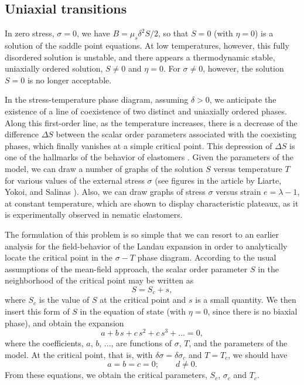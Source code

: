 \documentclass[aps,pre,reprint,amsmath,amssymbols,superscriptaddress,
nofootinbib]{revtex4-1}
\begin{document}
\subsection{Uniaxial transitions}

In zero stress, $\sigma=0$, we have $B=\mu_{s}\delta^{2}S/2$, so that $S=0 $
(with $\eta=0$) is a solution of the saddle point equations. At low
temperatures, however, this fully disordered solution is unstable, and there
appears a thermodynamic stable, uniaxially ordered solution, $S\neq0$ and
$\eta=0$. For $\sigma\neq0$, however, the solution $S=0$ is no longer acceptable.

In the stress-temperature phase diagram, assuming $\delta>0$, we anticipate
the existence of a line of coexistence of two distinct and uniaxially ordered
phases. Along this first-order line, as the temperature increases, there is a
decrease of the difference $\Delta S$ between the scalar order parameters
associated with the coexisting phases, which finally vanishes at a simple
critical point. This depression of $\Delta S$ is one of the hallmarks of the
behavior of elastomers \cite{Warner2003}. Given the parameters of the model,
we can draw a number of graphs of the solution $S$ versus temperature $T$ for
various values of the external stress $\sigma$ (see figures in the article by
Liarte, Yokoi, and Salinas \cite{Liarte2011}). Also, we can draw graphs of
stress $\sigma$ versus strain $e=\lambda-1$, at constant temperature, which
are shown to display characteristic plateaux, as it is experimentally observed
in nematic elastomers.

The formulation of this problem is so simple that we can resort to an earlier
analysis for the field-behavior of the Landau expansion \cite{Hornreich1985}
in order to analytically locate the critical point in the $\sigma-T$ phase
diagram. According to the usual assumptions of the mean-field approach, the
scalar order parameter $S$ in the neighborhood of the critical point may be
written as%
\begin{equation}
S=S_{c}+s,\label{s}%
\end{equation}
where $S_{c}$ is the value of $S$ at the critical point and $s$ is a small
quantity. We then insert this form of $S$ in the equation of state (with
$\eta=0$, since there is no biaxial phase), and obtain the expansion%
\begin{equation}
a+b\,s+c\,s^{2}+c\,s^{3}+...=0,\label{sexp}%
\end{equation}
where the coefficients, $a$, $b$, ..., are functions of $\sigma$, $T$, and the
parameters of the model. At the critical point, that is, with $\delta
\sigma=\delta\sigma_{c}$ and $T=T_{c}$, we should have%
\begin{equation}
a=b=c=0;\qquad d\neq0.
\end{equation}
From these equations, we obtain the critical parameters, $S_{c}$, $\sigma_{c}$
and $T_{c}$.
\end{document}
